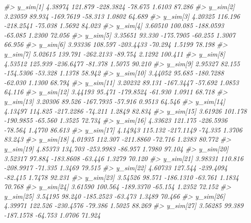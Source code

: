 \documentclass[
  10pt,
  italian,
  a4paper,
  extrafontsizes,onecolumn,openright
  ]{memoir}
\newenvironment{Shaded}{\begin{snugshade}}{\end{snugshade}}
\newcommand{\CommentTok}[1]{\textcolor[rgb]{0.56,0.35,0.01}{\textit{#1}}}
\begin{document}
\begin{Shaded}
\begin{Highlighting}[]
\CommentTok{\#\textgreater{}   y\_sim[1]    4.38974 121.879 {-}228.3824 {-}78.675  1.6103  87.286}
\CommentTok{\#\textgreater{}   y\_sim[2]    3.23059  89.934 {-}169.7619 {-}58.313  1.0802  64.689}
\CommentTok{\#\textgreater{}   y\_sim[3]    4.20325 116.196 {-}218.2541 {-}75.038  1.5692  84.023}
\CommentTok{\#\textgreater{}   y\_sim[4]    3.60510 100.085 {-}188.0593 {-}65.085  1.2300  72.056}
\CommentTok{\#\textgreater{}   y\_sim[5]    3.35651  93.330 {-}175.7905 {-}60.255  1.3007  66.956}
\CommentTok{\#\textgreater{}   y\_sim[6]    3.93336 108.597 {-}203.4433 {-}70.294  1.5199  78.198}
\CommentTok{\#\textgreater{}   y\_sim[7]    5.02615 139.791 {-}262.2133 {-}89.754  2.1292 100.411}
\CommentTok{\#\textgreater{}   y\_sim[8]    4.53512 125.939 {-}236.6477 {-}81.378  1.5075  90.210}
\CommentTok{\#\textgreater{}   y\_sim[9]    2.95327  82.155 {-}154.5306 {-}53.328  1.1378  58.942}
\CommentTok{\#\textgreater{}   y\_sim[10]   3.44052  95.685 {-}180.7288 {-}62.030  1.1300  68.794}
\CommentTok{\#\textgreater{}   y\_sim[11]   3.20232  89.131 {-}167.3447 {-}57.692  1.0853  64.116}
\CommentTok{\#\textgreater{}   y\_sim[12]   3.44193  95.471 {-}179.8524 {-}61.930  1.0911  68.718}
\CommentTok{\#\textgreater{}   y\_sim[13]   3.20306  89.526 {-}167.7935 {-}57.916  0.9513  64.546}
\CommentTok{\#\textgreater{}   y\_sim[14]   4.13497 114.825 {-}217.2286 {-}74.211  1.2849  82.834}
\CommentTok{\#\textgreater{}   y\_sim[15]   3.61926 101.178 {-}190.9855 {-}65.560  1.3525  72.734}
\CommentTok{\#\textgreater{}   y\_sim[16]   4.33623 121.175 {-}226.5936 {-}78.564  1.4770  86.613}
\CommentTok{\#\textgreater{}   y\_sim[17]   4.14943 115.132 {-}217.1149 {-}74.335  1.3706  83.243}
\CommentTok{\#\textgreater{}   y\_sim[18]   4.01935 112.307 {-}211.8860 {-}72.716  1.2383  80.772}
\CommentTok{\#\textgreater{}   y\_sim[19]   4.85373 134.703 {-}253.9983 {-}86.957  1.7980  97.104}
\CommentTok{\#\textgreater{}   y\_sim[20]   3.52317  97.884 {-}183.8608 {-}63.446  1.3279  70.120}
\CommentTok{\#\textgreater{}   y\_sim[21]   3.98331 110.816 {-}208.9917 {-}71.335  1.3469  79.515}
\CommentTok{\#\textgreater{}   y\_sim[22]   4.60733 127.544 {-}239.4094 {-}82.415  1.7478  92.231}
\CommentTok{\#\textgreater{}   y\_sim[23]   3.54526  98.571 {-}186.1310 {-}63.761  1.1834  70.768}
\CommentTok{\#\textgreater{}   y\_sim[24]   3.61590 100.564 {-}189.3370 {-}65.154  1.2352  72.152}
\CommentTok{\#\textgreater{}   y\_sim[25]   3.54195  98.240 {-}185.2523 {-}63.473  1.3489  70.466}
\CommentTok{\#\textgreater{}   y\_sim[26]   4.39971 122.526 {-}230.4576 {-}79.386  1.5025  88.269}
\CommentTok{\#\textgreater{}   y\_sim[27]   3.56285  99.389 {-}187.1578 {-}64.753  1.0706  71.924}

\end{Highlighting}
\end{Shaded}
\end{document}
